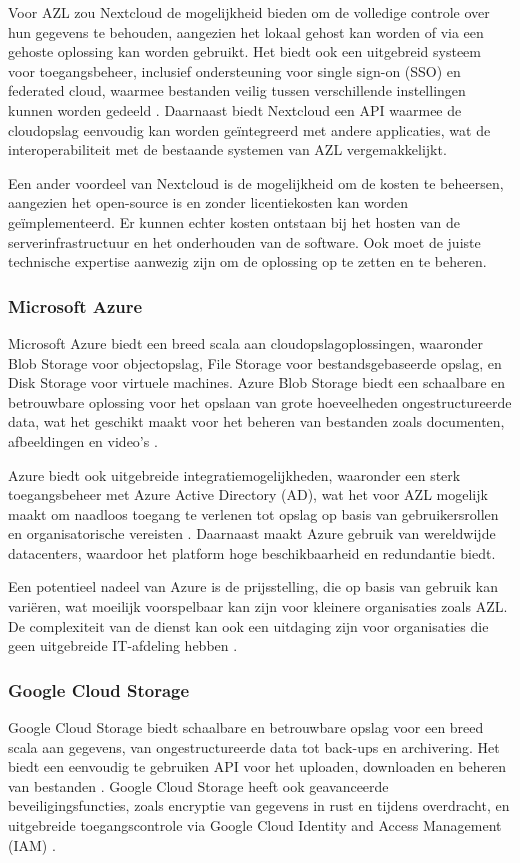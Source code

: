Voor AZL zou Nextcloud de mogelijkheid bieden om de volledige controle over hun gegevens te behouden, aangezien het lokaal gehost kan worden of via een gehoste oplossing kan worden gebruikt. Het biedt ook een uitgebreid systeem voor toegangsbeheer, inclusief ondersteuning voor single sign-on (SSO) en federated cloud, waarmee bestanden veilig tussen verschillende instellingen kunnen worden gedeeld \autocite{nextcloud_sso}. Daarnaast biedt Nextcloud een API waarmee de cloudopslag eenvoudig kan worden geïntegreerd met andere applicaties, wat de interoperabiliteit met de bestaande systemen van AZL vergemakkelijkt.

Een ander voordeel van Nextcloud is de mogelijkheid om de kosten te beheersen, aangezien het open-source is en zonder licentiekosten kan worden geïmplementeerd. Er kunnen echter kosten ontstaan bij het hosten van de serverinfrastructuur en het onderhouden van de software. Ook moet de juiste technische expertise aanwezig zijn om de oplossing op te zetten en te beheren.

\subsubsection{Microsoft Azure}
Microsoft Azure biedt een breed scala aan cloudopslagoplossingen, waaronder Blob Storage voor objectopslag, File Storage voor bestandsgebaseerde opslag, en Disk Storage voor virtuele machines. Azure Blob Storage biedt een schaalbare en betrouwbare oplossing voor het opslaan van grote hoeveelheden ongestructureerde data, wat het geschikt maakt voor het beheren van bestanden zoals documenten, afbeeldingen en video's \autocite{azure_blob}.

Azure biedt ook uitgebreide integratiemogelijkheden, waaronder een sterk toegangsbeheer met Azure Active Directory (AD), wat het voor AZL mogelijk maakt om naadloos toegang te verlenen tot opslag op basis van gebruikersrollen en organisatorische vereisten \autocite{azure_ad}. Daarnaast maakt Azure gebruik van wereldwijde datacenters, waardoor het platform hoge beschikbaarheid en redundantie biedt.

Een potentieel nadeel van Azure is de prijsstelling, die op basis van gebruik kan variëren, wat moeilijk voorspelbaar kan zijn voor kleinere organisaties zoals AZL. De complexiteit van de dienst kan ook een uitdaging zijn voor organisaties die geen uitgebreide IT-afdeling hebben \autocite{azure_pricing}.

\subsubsection{Google Cloud Storage}
Google Cloud Storage biedt schaalbare en betrouwbare opslag voor een breed scala aan gegevens, van ongestructureerde data tot back-ups en archivering. Het biedt een eenvoudig te gebruiken API voor het uploaden, downloaden en beheren van bestanden \autocite{google_storage}. Google Cloud Storage heeft ook geavanceerde beveiligingsfuncties, zoals encryptie van gegevens in rust en tijdens overdracht, en uitgebreide toegangscontrole via Google Cloud Identity and Access Management (IAM) \autocite{google_iam}.

